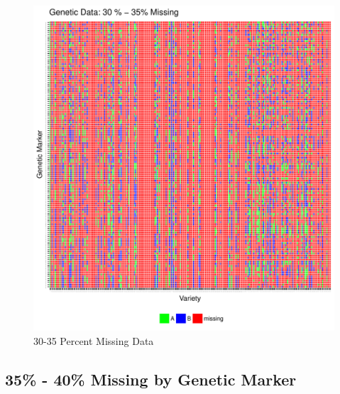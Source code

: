 \documentclass[11pt]{article}\usepackage[]{graphicx}\usepackage[]{color}
\makeatletter
\def\maxwidth{ %
  \ifdim\Gin@nat@width>\linewidth
    \linewidth
  \else
    \Gin@nat@width
  \fi
}
\newenvironment{knitrout}{}{} %
\makeatother
\begin{document}
\begin{knitrout}\footnotesize
{}\color{fgcolor}\begin{figure}[H]

{\centering \includegraphics[width=\maxwidth]{figure/missing_plot35-1} 

}

\caption[30-35 Percent Missing Data]{30-35 Percent Missing Data}\label{fig:missing.plot35}
\end{figure}


\end{knitrout}

\newpage

\subsection{35\% - 40\% Missing by Genetic Marker}
\end{document}
